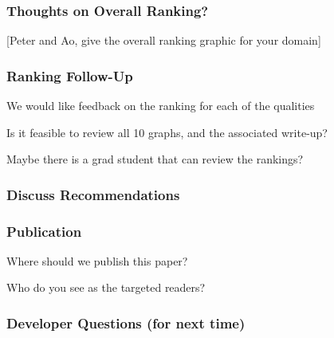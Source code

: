\documentclass[t,12pt,numbers,fleqn]{beamer}
\begin{document}

\begin{frame}
\frametitle{Thoughts on Overall Ranking?}

[Peter and Ao, give the overall ranking graphic for your domain]

\end{frame}


\begin{frame}
\frametitle{Ranking Follow-Up}

\bi
\item We would like feedback on the ranking for each of the qualities
\item Is it feasible to review all 10 graphs, and the associated write-up?
\item Maybe there is a grad student that can review the rankings?
 \ei

\end{frame}


\begin{frame}
\frametitle{Discuss Recommendations}

\bi
\item 
\ei

\end{frame}


\begin{frame}
\frametitle{Publication}

\bi
\item Where should we publish this paper?
\item Who do you see as the targeted readers?
\ei

\end{frame}


\begin{frame}
\frametitle{Developer Questions (for next time)}

\bi
\item 
\ei

\end{frame}

\end{document}
